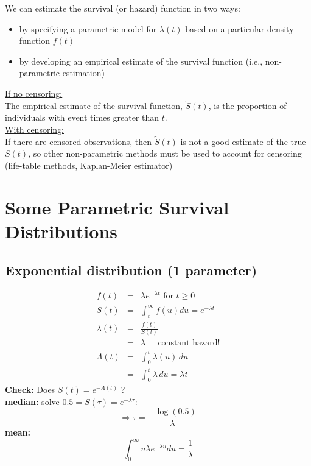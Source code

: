 \documentclass[11pt,slidesonly,semrot,portrait,palatino]{book}
\begin{document}
We can estimate the survival (or hazard) function in two
ways:
\begin{itemize}
\item by specifying a parametric model for $\lambda(t)$
based on a particular density function $f(t)$
\item by developing an empirical estimate of the survival
function (i.e., non-parametric estimation)
\end{itemize}
\underline{If no censoring:}\\
The empirical estimate of the survival function, $\tilde{S}(t)$,
is the proportion of individuals with event times greater than $t$.
\\[2ex]
\underline{With censoring:}\\
If there are censored observations, then $\tilde{S}(t)$ is not a
good estimate of the true $S(t)$, so other non-parametric methods
must be used to account for censoring (life-table methods,
Kaplan-Meier estimator)
\section{Some Parametric Survival Distributions}
\subsection{Exponential distribution  (1 parameter)}
\begin{eqnarray*}
f(t) & = & \lambda e^{-\lambda t} \mbox{ for } t\ge 0 \\[2ex]
S(t) & = & \int_t^\infty f(u) du  =  e^{-\lambda t} \\[2ex]
\lambda(t) & = & \frac{f(t)}{S(t)} \\
& = & \lambda ~~~~~\mbox{ constant hazard!} \\[2ex]
\Lambda(t) & = & \int_0^t \lambda(u) \, du \\[1ex]
 & = & \int_0^t \lambda \, du = \lambda t
\end{eqnarray*}
{\bf Check:} Does $S(t)=e^{-\Lambda(t)}$ ? \\[2ex]
{\bf median:} solve $0.5=S(\tau)=e^{-\lambda \tau}$:
\[\Rightarrow \tau=\frac{-\log(0.5)}{\lambda}\]
{\bf mean:}
\[\int_0^\infty u\lambda e^{-\lambda u}du=\frac{1}{\lambda}\]
\end{document}
